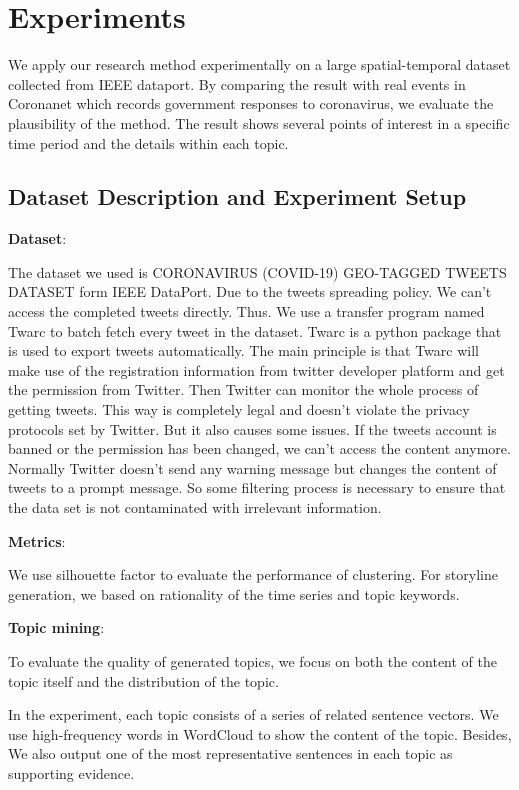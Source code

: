 \section{Experiments}
\label{sec:exp}
We apply our research method experimentally on a large spatial-temporal dataset collected from IEEE dataport. By comparing the result with real events in Coronanet which records government responses to coronavirus, we evaluate the plausibility of the method. The result shows several points of interest in a specific time period and the details within each topic.
\subsection{Dataset Description and Experiment Setup}
{\bf Dataset}: 

The dataset we used is CORONAVIRUS (COVID-19) GEO-TAGGED TWEETS DATASET form IEEE DataPort. Due to the tweets spreading policy. We can’t access the completed tweets directly. Thus. We use a transfer program named Twarc to batch fetch every tweet in the dataset. Twarc is a python package that is used to export tweets automatically. The main principle is that Twarc will make use of the registration information from twitter developer platform and get the permission from Twitter. Then Twitter can monitor the whole process of getting tweets. This way is completely legal and doesn’t violate the privacy protocols set by Twitter. But it also causes some issues. If the tweets account is banned or the permission has been changed, we can’t access the content anymore. Normally Twitter doesn’t send any warning message but changes the content of tweets to a prompt message. So some filtering process is necessary to ensure that the data set is not contaminated with irrelevant information.

{\bf Metrics}:

We use silhouette factor to evaluate the performance of clustering. For storyline generation, we based on rationality of the time series and topic keywords. 

{\bf Topic mining}:

To evaluate the quality of generated topics, we focus on both the content of the topic itself and the distribution of the topic. 


In the experiment, each topic consists of a series of related sentence vectors. We use high-frequency words in WordCloud to show the content of the topic. Besides, We also output one of the most representative sentences in each topic as supporting evidence. 

